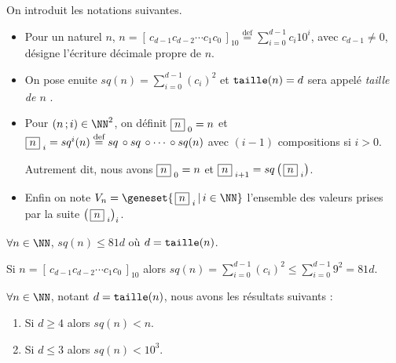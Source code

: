 On introduit les notations suivantes.
\begin{itemize}[label = \textbullet]
	\item Pour un naturel $n$,
	$\displaystyle      n =  \left[ \, c_{d-1} c_{d-2} \cdots c_1 c_0 \, \right]_{10} 
	\stackrel{\text{def}}{=} \sum_{i=0}^{d-1} c_i 10^i$,
	avec $c_{d-1} \neq 0$, désigne l'écriture décimale propre de $n$.
	
	\item On pose enuite
	$\displaystyle sq(n) = \sum_{i=0}^{d-1} (c_i)^2$
	et
	$\operatorname{\text{\normalfont\texttt{taille}}}(n) = d$ sera appelé \emph{\og taille de $n$ \fg}.


	\item Pour $(n \,; i) \in \NN^2$, on définit 
	$  \fbox{$n$}_{\,\,0} = n$
	et
	$  \fbox{$n$}_{\,\,i} = sq^i(n)
	\stackrel{\text{def}}{=} sq \,\circ sq \,\circ \cdots \,\circ sq(n)$ avec $(i-1)$ compositions si $i > 0$.
	
	
	\smallskip\noindent
	Autrement dit, nous avons
	$\fbox{$n$}_{\,\,0} = n$
	et
	$\fbox{$n$}_{\,\,i+1} = sq \left( \, \fbox{$n$}_{\,\,i} \right)$.


	\item Enfin on note
	$V_n = \geneset{ \, \sqseq{n}{i} \, | \, i \in \NN }$
	l'ensemble des valeurs prises par la suite $\left( \, \fbox{$n$}_{\,\,i} \right)_i$.
\end{itemize}



\bigskip

\begin{fact}
	$\forall n \in \NN$, $sq(n) \leqslant 81 d$ où $d = \operatorname{\text{\normalfont\texttt{taille}}}(n)$.
\end{fact}

\begin{proof*}
	Si $n = \left[ \, c_{d-1} c_{d-2} \cdots c_1 c_0 \, \right]_{10}$
	alors 
	$\displaystyle sq(n) = \sum_{i=0}^{d-1} (c_i)^2 \leqslant \sum_{i=0}^{d-1} 9^2 = 81 d $.
\end{proof*}




\medskip

\begin{fact}\label{magicmajo}
	$\forall n \in \NN$, notant $d = \operatorname{\text{\normalfont\texttt{taille}}}(n)$, nous avons les résultats suivants :
	
	\begin{enumerate}
		\item Si $d \geqslant 4$ alors $sq(n) < n$.
		
		\item Si $d \leqslant 3$ alors $sq(n) < 10^3$.
	\end{enumerate}
\end{fact}

